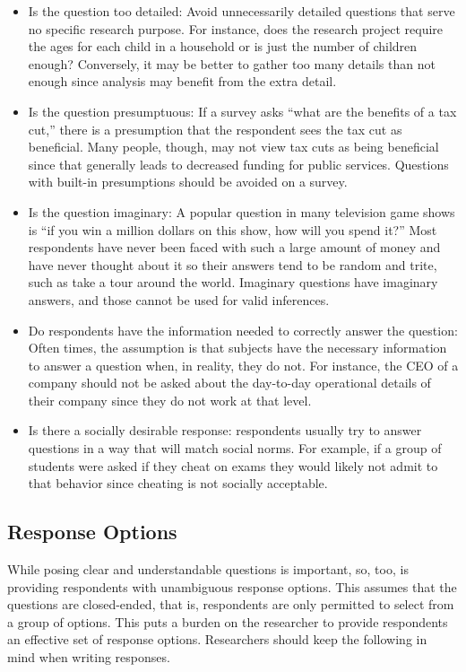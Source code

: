 \begin{itemize}
	\item Is the question too detailed: Avoid unnecessarily detailed questions that serve no specific research purpose. For instance, does the research project require the ages for each child in a household or is just the number of children enough? Conversely, it may be better to gather too many details than not enough since analysis may benefit from the extra detail.

	\item Is the question presumptuous: If a survey asks ``what are the benefits of a tax cut,'' there is a presumption that the respondent sees the tax cut as beneficial. Many people, though, may not view tax cuts as being beneficial since that generally leads to decreased funding for public services. Questions with built-in presumptions should be avoided on a survey.

	\item Is the question imaginary: A popular question in many television game shows is ``if you win a million dollars on this show, how will you spend it?'' Most respondents have never been faced with such a large amount of money and have never thought about it so their answers tend to be random and trite, such as take a tour around the world. Imaginary questions have imaginary answers, and those cannot be used for valid inferences.

	\item Do respondents have the information needed to correctly answer the question: Often times, the assumption is that subjects have the necessary information to answer a question when, in reality, they do not. For instance, the CEO of a company should not be asked about the day-to-day operational details of their company since they do not work at that level.

	\item Is there a socially desirable response: respondents usually try to answer questions in a way that will match social norms. For example, if a group of students were asked if they cheat on exams they would likely not admit to that behavior since cheating is not socially acceptable. 
\end{itemize}

\subsection{Response Options}

While posing clear and understandable questions is important, so, too, is providing respondents with unambiguous response options. This assumes that the questions are closed-ended, that is, respondents are only permitted to select from a group of options. This puts a burden on the researcher to provide respondents an effective set of response options. Researchers should keep the following in mind when writing responses.

